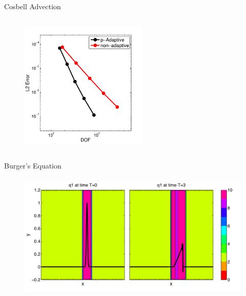 \documentclass[sansserif]{beamer}
\begin{document}
\begin{frame}{Cosbell Advection}
\begin{columns}
\medskip

\medskip


\begin{figure}
\vspace{-0.7cm}
\includegraphics[height=2.4in]{final/efficency.pdf}
\end{figure}
\end{columns}
\end{frame}

\begin{frame}{Burger's Equation}
\begin{figure}
\vspace{-0.7cm}
\includegraphics[height=2.4in]{final/burgers_heat.pdf}
\end{figure}
\end{frame}
\end{document}
